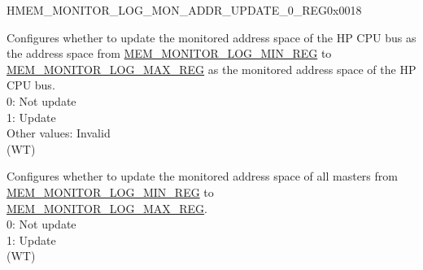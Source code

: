 \begin{register}{H}{MEM\_MONITOR\_LOG\_MON\_ADDR\_UPDATE\_0\_REG}{0x0018}\label{regdesc:MEMMONITORLOGMONADDRUPDATE0REG}
%
%
%
\regnewline%
\begin{regdesc}\begin{reglist}
\label{fielddesc:MEMMONITORLOGMONADDRCOREUPDATE}\item [MEM\_MONITOR\_LOG\_MON\_ADDR\_CORE\_UPDATE] Configures whether to update the monitored address space of the HP CPU bus as the address space from \hyperref[regdesc:MEMMONITORLOGMINREG]{MEM\_MONITOR\_LOG\_MIN\_REG} to \hyperref[regdesc:MEMMONITORLOGMAXREG]{MEM\_MONITOR\_LOG\_MAX\_REG} as the monitored address space of the HP CPU bus.\\
0: Not update\\
1: Update\\
Other values: Invalid \\ (WT)
\label{fielddesc:MEMMONITORLOGMONADDRALLUPDATE}\item [MEM\_MONITOR\_LOG\_MON\_ADDR\_ALL\_UPDATE] Configures whether to update the monitored address space of all masters from \hyperref[regdesc:MEMMONITORLOGMINREG]{MEM\_MONITOR\_LOG\_MIN\_REG} to \hyperref[regdesc:MEMMONITORLOGMAXREG]{MEM\_MONITOR\_LOG\_MAX\_REG}.\\
0: Not update\\
1: Update\\ (WT)
\end{reglist}\end{regdesc}
\end{register}


